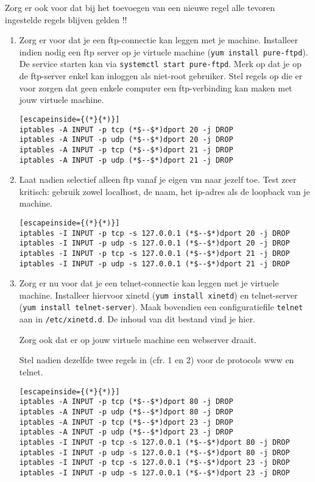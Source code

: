 \documentclass{report}
\begin{document}
Zorg er ook voor dat bij het toevoegen van een nieuwe regel alle tevoren ingestelde regels blijven gelden !!
\begin{enumerate}
	\item     Zorg er voor dat je een ftp-connectie kan leggen met je machine. Installeer indien nodig een ftp server op je virtuele machine (\texttt{yum install pure-ftpd}).
    De service starten kan via \texttt{systemctl start pure-ftpd}. Merk op dat je op de ftp-server enkel kan inloggen als niet-root gebruiker.
	Stel regels op die er voor zorgen dat geen enkele computer een ftp-verbinding kan maken met jouw virtuele machine.
	\begin{lstlisting}[escapeinside={(*}{*)}]
iptables -A INPUT -p tcp (*$--$*)dport 20 -j DROP
iptables -A INPUT -p udp (*$--$*)dport 20 -j DROP
iptables -A INPUT -p tcp (*$--$*)dport 21 -j DROP
iptables -A INPUT -p udp (*$--$*)dport 21 -j DROP
	\end{lstlisting}
	\item     Laat nadien selectief alleen ftp vanaf je eigen vm naar jezelf toe. Test zeer kritisch: gebruik zowel localhost, de naam, het ip-adres als de loopback van je machine.
	\begin{lstlisting}[escapeinside={(*}{*)}]
iptables -I INPUT -p tcp -s 127.0.0.1 (*$--$*)dport 20 -j DROP
iptables -I INPUT -p udp -s 127.0.0.1 (*$--$*)dport 20 -j DROP
iptables -I INPUT -p tcp -s 127.0.0.1 (*$--$*)dport 21 -j DROP
iptables -I INPUT -p udp -s 127.0.0.1 (*$--$*)dport 21 -j DROP
	\end{lstlisting}
	\item     Zorg er nu voor dat je een telnet-connectie kan leggen met je virtuele machine. Installeer hiervoor xinetd (\texttt{yum install xinetd}) en telnet-server (\texttt{yum install telnet-server}). Maak bovendien een configuratiefile \texttt{telnet} aan in \texttt{/etc/xinetd.d}. De inhoud van dit bestand vind je hier.
   
	Zorg ook dat er op jouw virtuele machine een webserver draait.

	Stel nadien dezelfde twee regels in (cfr. 1 en 2) voor de protocols www en telnet.
	\begin{lstlisting}[escapeinside={(*}{*)}]
iptables -A INPUT -p tcp (*$--$*)dport 80 -j DROP
iptables -A INPUT -p udp (*$--$*)dport 80 -j DROP
iptables -A INPUT -p tcp (*$--$*)dport 23 -j DROP
iptables -A INPUT -p udp (*$--$*)dport 23 -j DROP
iptables -I INPUT -p tcp -s 127.0.0.1 (*$--$*)dport 80 -j DROP
iptables -I INPUT -p udp -s 127.0.0.1 (*$--$*)dport 80 -j DROP
iptables -I INPUT -p tcp -s 127.0.0.1 (*$--$*)dport 23 -j DROP
iptables -I INPUT -p udp -s 127.0.0.1 (*$--$*)dport 23 -j DROP
	\end{lstlisting}


\end{enumerate}
\end{document}
